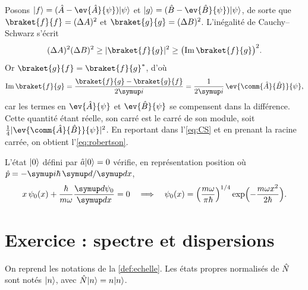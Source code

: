 \begin{demonstration}
  Posons $\ket{f}=(\op{A}-\ev{\op{A}}{\psi})\ket{\psi}$ et
  $\ket{g}=(\op{B}-\ev{\op{B}}{\psi})\ket{\psi}$, de sorte que
  $\braket{f}{f}=(\Delta A)^{2}$ et $\braket{g}{g}=(\Delta B)^{2}$.
  L'inégalité de Cauchy–Schwarz s'écrit
  \begin{equation}
    (\Delta A)^{2}(\Delta B)^{2} \geq \abs{\braket{f}{g}}^{2}
    \geq \bigl(\Imag\braket{f}{g}\bigr)^{2}.
    \label{eq:CS}
  \end{equation}
  Or $\braket{g}{f}=\braket{f}{g}\cc$, d'où
  \begin{equation}
    \Imag\braket{f}{g}=\frac{\braket{f}{g}-\braket{g}{f}}{2\ii}
    =\frac{1}{2\ii}\,\ev{\comm{\op{A}}{\op{B}}}{\psi},
  \end{equation}
  car les termes en $\ev{\op{A}}{\psi}$ et $\ev{\op{B}}{\psi}$ se compensent
  dans la différence. Cette quantité étant réelle, son carré est le carré de
  son module, soit $\tfrac14\abs{\ev{\comm{\op{A}}{\op{B}}}{\psi}}^{2}$. En
  reportant dans l'\cref{eq:CS} et en prenant la racine carrée, on obtient
  l'\cref{eq:robertson}.
\end{demonstration}

\begin{exemple}\label{ex:fondamental}
  L'état $\lvert0\rangle$ défini par $\hat{a}\lvert0\rangle=0$ vérifie, en représentation
  position où $\op{p}=-\ii\hbar\,\dd/\dd x$,
  \begin{equation}
    x\,\psi_{0}(x)+\frac{\hbar}{m\omega}\dv{\psi_{0}}{x}=0
    \quad\Longrightarrow\quad
    \psi_{0}(x)=\Bigl(\frac{m\omega}{\pi\hbar}\Bigr)^{1/4}
      \exp\Bigl(-\frac{m\omega x^{2}}{2\hbar}\Bigr).
    \label{eq:psi0}
  \end{equation}
\end{exemple}

\section{Exercice : spectre et dispersions}

\begin{exercice}\label{exo:oh}
  On reprend les notations de la \cref{def:echelle}. Les états propres
  normalisés de $\hat{N}$ sont notés $\lvert n\rangle$, avec $\hat{N}\lvert n\rangle=n\lvert n\rangle$.
\end{exercice}

